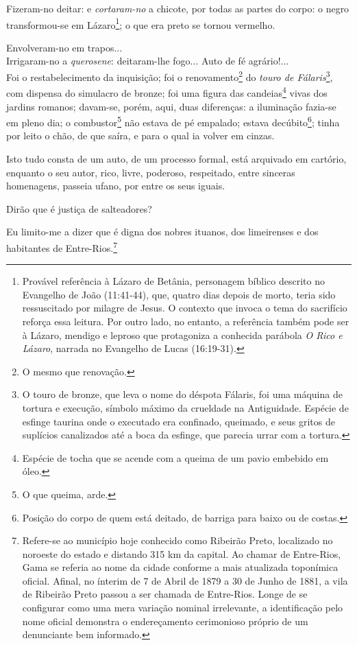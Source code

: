 Fizeram-no deitar: e \emph{cortaram-no} a chicote, por todas as partes
do corpo: o negro transformou-se em Lázaro\footnote{Provável
  referência à Lázaro de Betânia, personagem bíblico descrito no
  Evangelho de João (11:41-44), que, quatro dias depois de morto, teria
  sido ressuscitado por milagre de Jesus. O contexto que invoca o tema
  do sacrifício reforça essa leitura. Por outro lado, no entanto, a
  referência também pode ser à Lázaro, mendigo e leproso que protagoniza
  a conhecida parábola \emph{O Rico e Lázaro}, narrada no Evangelho de
  Lucas (16:19-31).}; o que era preto se tornou vermelho.

Envolveram-no em trapos...\\
Irrigaram-no a \emph{querosene}: deitaram-lhe fogo... Auto de fé
agrário!...\\
Foi o restabelecimento da inquisição; foi o renovamento\footnote{O
  mesmo que renovação.} do \emph{touro de Fálaris}\footnote{O touro de
  bronze, que leva o nome do déspota Fálaris, foi uma máquina de tortura
  e execução, símbolo máximo da crueldade na Antiguidade. Espécie de
  esfinge taurina onde o executado era confinado, queimado, e seus
  gritos de suplícios canalizados até a boca da esfinge, que parecia
  urrar com a tortura.}, com dispensa do simulacro de bronze; foi uma
figura das candeias\footnote{Espécie de tocha que se acende com a
  queima de um pavio embebido em óleo.} vivas dos jardins romanos;
davam-se, porém, aqui, duas diferenças: a iluminação fazia-se em pleno
dia; o combustor\footnote{O que queima, arde.} não estava de pé
empalado; estava decúbito\footnote{Posição do corpo de quem está
  deitado, de barriga para baixo ou de costas.}; tinha por leito o chão,
de que saíra, e para o qual ia volver em cinzas.

Isto tudo consta de um auto, de um processo formal, está arquivado em
cartório, enquanto o seu autor, rico, livre, poderoso, respeitado, entre
sinceras homenagens, passeia ufano, por entre os seus iguais.

Dirão que é justiça de salteadores?

Eu limito-me a dizer que é digna dos nobres ituanos, dos limeirenses e
dos habitantes de Entre-Rios.\footnote{Refere-se ao município hoje
  conhecido como Ribeirão Preto, localizado no noroeste do estado e
  distando 315 km da capital. Ao chamar de Entre-Rios, Gama se referia
  ao nome da cidade conforme a mais atualizada toponímica oficial.
  Afinal, no ínterim de 7 de Abril de 1879 a 30 de Junho de 1881, a vila
  de Ribeirão Preto passou a ser chamada de Entre-Rios. Longe de se
  configurar como uma mera variação nominal irrelevante, a identificação
  pelo nome oficial demonstra o endereçamento cerimonioso próprio de um
  denunciante bem informado.}

